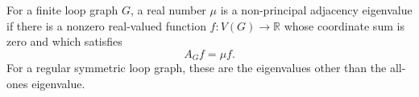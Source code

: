 \begin{definition}
For a finite loop graph \(G\), a real number \(\mu\) is a non-principal adjacency eigenvalue if there is a nonzero real-valued function \(f\colon V(G)\to \mathbb R\) whose coordinate sum is zero and which satisfies
\[
  A_G f = \mu f.
\]
For a regular symmetric loop graph, these are the eigenvalues other than the all-ones eigenvalue.
\end{definition}
